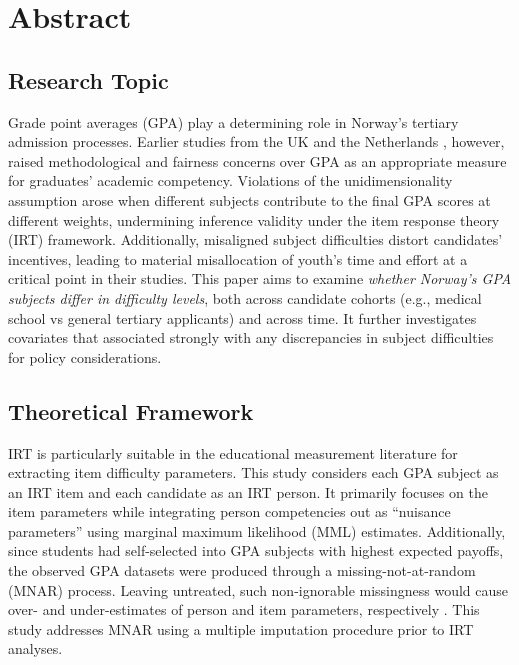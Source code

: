 \section{Abstract}


\subsection{Research Topic}

Grade point averages (GPA) play a determining role in Norway's tertiary admission processes. Earlier studies from the UK \parencite{he:2018} and the Netherlands \parencite{korobko:2008}, however, raised methodological and fairness concerns over GPA as an appropriate measure for graduates' academic competency. Violations of the unidimensionality assumption arose when different subjects contribute to the final GPA scores at different weights, undermining inference validity under the item response theory (IRT) framework. Additionally, misaligned subject difficulties distort candidates' incentives, leading to material misallocation of youth's time and effort at a critical point in their studies. This paper aims to examine \emph{whether Norway's GPA subjects differ in difficulty levels}, both across candidate cohorts (e.g., medical school vs general tertiary applicants) and across time. It further investigates covariates that associated strongly with any discrepancies in subject difficulties for policy considerations.

\subsection{Theoretical Framework}

IRT is particularly suitable in the educational measurement literature for extracting item difficulty parameters. This study considers each GPA subject as an IRT item and each candidate as an IRT person. It primarily focuses on the item parameters while integrating person competencies out as ``nuisance parameters'' using marginal maximum likelihood (MML) estimates. Additionally, since students had self-selected into GPA subjects with highest expected payoffs, the observed GPA datasets were produced through a missing-not-at-random (MNAR) process. Leaving untreated, such non-ignorable missingness would cause over- and under-estimates of person and item parameters, respectively \parencite{rose:2013}. This study addresses MNAR using a multiple imputation procedure prior to IRT analyses.

